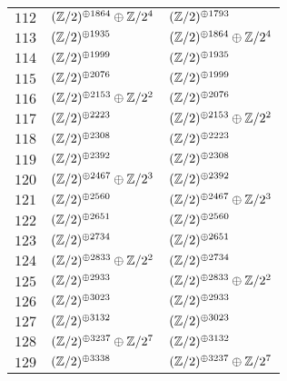 \begin{supertabular}{|c|p{5.5cm}|p{5.5cm}|}
$112$%
&$(\mathbb{Z}/2)^{\oplus1864}\oplus\mathbb{Z}/2^{4}$%
&$(\mathbb{Z}/2)^{\oplus1793}$\\

$113$%
&$(\mathbb{Z}/2)^{\oplus1935}$%
&$(\mathbb{Z}/2)^{\oplus1864}\oplus\mathbb{Z}/2^{4}$\\

$114$%
&$(\mathbb{Z}/2)^{\oplus1999}$%
&$(\mathbb{Z}/2)^{\oplus1935}$\\

$115$%
&$(\mathbb{Z}/2)^{\oplus2076}$%
&$(\mathbb{Z}/2)^{\oplus1999}$\\

$116$%
&$(\mathbb{Z}/2)^{\oplus2153}\oplus\mathbb{Z}/2^{2}$%
&$(\mathbb{Z}/2)^{\oplus2076}$\\

$117$%
&$(\mathbb{Z}/2)^{\oplus2223}$%
&$(\mathbb{Z}/2)^{\oplus2153}\oplus\mathbb{Z}/2^{2}$\\

$118$%
&$(\mathbb{Z}/2)^{\oplus2308}$%
&$(\mathbb{Z}/2)^{\oplus2223}$\\

$119$%
&$(\mathbb{Z}/2)^{\oplus2392}$%
&$(\mathbb{Z}/2)^{\oplus2308}$\\

$120$%
&$(\mathbb{Z}/2)^{\oplus2467}\oplus\mathbb{Z}/2^{3}$%
&$(\mathbb{Z}/2)^{\oplus2392}$\\

$121$%
&$(\mathbb{Z}/2)^{\oplus2560}$%
&$(\mathbb{Z}/2)^{\oplus2467}\oplus\mathbb{Z}/2^{3}$\\

$122$%
&$(\mathbb{Z}/2)^{\oplus2651}$%
&$(\mathbb{Z}/2)^{\oplus2560}$\\

$123$%
&$(\mathbb{Z}/2)^{\oplus2734}$%
&$(\mathbb{Z}/2)^{\oplus2651}$\\

$124$%
&$(\mathbb{Z}/2)^{\oplus2833}\oplus\mathbb{Z}/2^{2}$%
&$(\mathbb{Z}/2)^{\oplus2734}$\\

$125$%
&$(\mathbb{Z}/2)^{\oplus2933}$%
&$(\mathbb{Z}/2)^{\oplus2833}\oplus\mathbb{Z}/2^{2}$\\

$126$%
&$(\mathbb{Z}/2)^{\oplus3023}$%
&$(\mathbb{Z}/2)^{\oplus2933}$\\

$127$%
&$(\mathbb{Z}/2)^{\oplus3132}$%
&$(\mathbb{Z}/2)^{\oplus3023}$\\

$128$%
&$(\mathbb{Z}/2)^{\oplus3237}\oplus\mathbb{Z}/2^{7}$%
&$(\mathbb{Z}/2)^{\oplus3132}$\\

$129$%
&$(\mathbb{Z}/2)^{\oplus3338}$%
&$(\mathbb{Z}/2)^{\oplus3237}\oplus\mathbb{Z}/2^{7}$\\


\end{supertabular}

